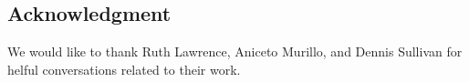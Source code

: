 
\subsection*{Acknowledgment}

We would like to thank Ruth Lawrence, Aniceto Murillo, and Dennis Sullivan for helful conversations related to their work.